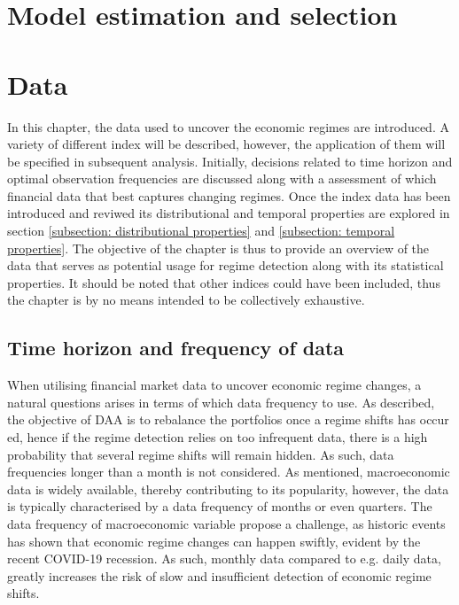 \section{Model estimation and selection}

\newpage
\section{Data}
\label{section: Data}
In this chapter, the data used to uncover the economic regimes are introduced. A variety of different index will be described, however, the application of them will be specified in subsequent analysis. Initially, decisions related to time horizon and optimal observation frequencies are discussed along with a assessment of which financial data that best captures changing regimes. Once the index data has been introduced and reviwed its distributional and temporal properties are explored in section \ref{subsection: distributional properties} and \ref{subsection: temporal properties}. The objective of the chapter is thus to provide an overview of the data that serves as potential usage for regime detection along with its statistical properties. It should be noted that other indices could have been included, thus the chapter is by no means intended to be collectively exhaustive. 

\subsection{Time horizon and frequency of data}
\label{subsection: Data frequency}
When utilising financial market data to uncover economic regime changes, a natural questions arises in terms of which data frequency to use. As described, the objective of DAA is to rebalance the portfolios once a regime shifts has occur ed, hence if the regime detection relies on too infrequent data, there is a high probability that several regime shifts will remain hidden. As such, data frequencies longer than a month is not considered. As mentioned, macroeconomic data is widely available, thereby contributing to its popularity, however, the data is typically characterised by a data frequency of months or even quarters. The data frequency of macroeconomic variable propose a challenge, as historic events has shown that economic regime changes can happen swiftly, evident by the recent COVID-19 recession. As such, monthly data compared to e.g. daily data, greatly increases the risk of slow and insufficient detection of economic regime shifts.
 
